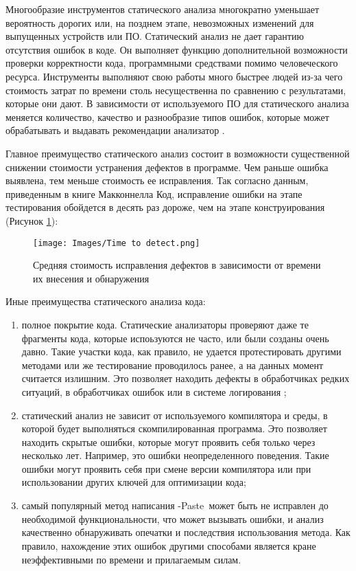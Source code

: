 Многообразие инструментов статического анализа многократно уменьшает вероятность дорогих или, на позднем этапе, невозможных изменений для выпущенных устройств или ПО. 
Статический анализ не дает гарантию отсутствия ошибок в коде. Он выполняет функцию дополнительной возможности проверки корректности кода, программными средствами помимо человеческого ресурса. Инструменты выполняют свою работы много быстрее людей из-за чего стоимость затрат по времени столь несущественна по сравнению с результатами, которые они дают. В зависимости от используемого ПО для статического анализа меняется количество, качество и разнообразие типов ошибок, которые может обрабатывать и выдавать рекомендации анализатор \cite{14}.

Главное преимущество статического анализ состоит в возможности существенной снижении стоимости устранения дефектов в программе. Чем раньше ошибка выявлена, тем меньше стоимость ее исправления. Так согласно данным, приведенным в книге Макконнелла  Код\guillemotright, исправление ошибки на этапе тестирования обойдется в десять раз дороже, чем на этапе конструирования (Рисунок \ref{fig:1}):


    \begin{figure}[!h]
    \center
    \texttt{[image: Images/Time to detect.png]}
    \caption{Средняя стоимость исправления дефектов в зависимости от времени их внесения и обнаружения }
    \textwidth{ https://import.viva64.com/docx/terminology/Staticcodeanalysisru/image2.png}
        \label{fig:1}
    \end{figure}

Иные преимущества статического анализа кода:

\begin{enumerate}

    \item полное покрытие кода. Статические анализаторы проверяют даже те фрагменты кода, которые испоьзуются не часто, или были созданы очень давно. Такие участки кода, как правило, не удается протестировать другими методами или же тестирование проводилось ранее, а на данных момент считается излишним. Это позволяет находить дефекты в обработчиках редких ситуаций, в обработчиках ошибок или в системе логирования \cite{15};
    
    \item статический анализ не зависит от используемого компилятора и среды, в которой будет выполняться скомпилированная программа. Это позволяет находить скрытые ошибки, которые могут проявить себя только через несколько лет. Например, это ошибки неопределенного поведения. Такие ошибки могут проявить себя при смене версии компилятора или при использовании других ключей для оптимизации кода;
      
    \item самый популярный метод написания \guillemotleftCopy-Paste\guillemotright\verb| |может быть не исправлен до необходимой функциональности, что может вызывать ошибки, и анализ качественно обнаруживать опечатки и последствия использования метода. Как правило, нахождение этих ошибок другими способами является кране неэффективными по времени и прилагаемым силам.

\end{enumerate}

